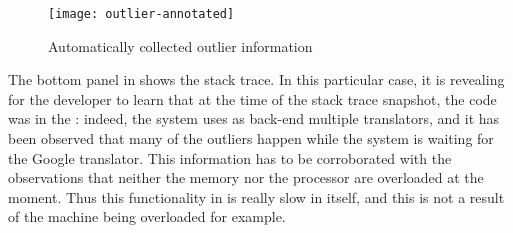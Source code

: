   \begin{figure}[h!]
    \centering
    \texttt{[image: outlier-annotated]}
    \caption{Automatically collected outlier information}
    \label{fig:stack}
  \end{figure}
  

The bottom panel in  shows the stack trace. 
In this particular case, it is revealing for the developer to learn that at the time of the stack trace snapshot, the code was in the : indeed, the system uses as back-end multiple translators, and it has been observed that many of the outliers happen while the system is waiting for the Google translator.
%
This information has to be corroborated with the observations that neither the memory nor the processor are overloaded at the moment. Thus this functionality in  is really slow in itself, and this is not a result of the machine being overloaded for example. 




